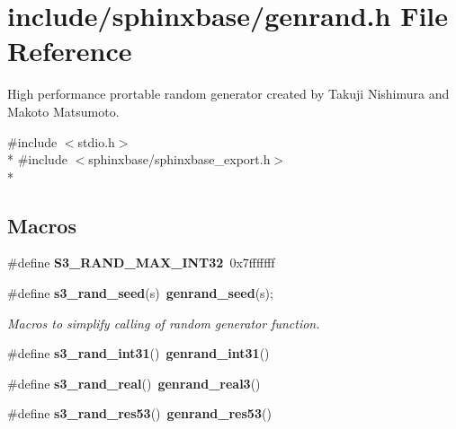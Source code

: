 \section{include/sphinxbase/genrand.h File Reference}
\label{genrand_8h}


High performance prortable random generator created by Takuji Nishimura and Makoto Matsumoto.  


{\ttfamily \#include $<$stdio.\-h$>$}\\*
{\ttfamily \#include $<$sphinxbase/sphinxbase\-\_\-export.\-h$>$}\\*
\subsection*{Macros}
\begin{DoxyCompactItemize}
\item 
\#define {\bfseries S3\-\_\-\-R\-A\-N\-D\-\_\-\-M\-A\-X\-\_\-\-I\-N\-T32}~0x7fffffff\label{genrand_8h_a29d6253e4a57e7c4d56cf7f6155b4007}

\item 
\#define {\bf s3\-\_\-rand\-\_\-seed}(s)~{\bf genrand\-\_\-seed}(s);\label{genrand_8h_a88ed88daecb88e115d8559c1b0a09bb7}

\begin{DoxyCompactList}\small\item\em Macros to simplify calling of random generator function. \end{DoxyCompactList}\item 
\#define {\bfseries s3\-\_\-rand\-\_\-int31}()~{\bf genrand\-\_\-int31}()\label{genrand_8h_a3dcc058023a95c0a0ca1f12d1fdec9b9}

\item 
\#define {\bfseries s3\-\_\-rand\-\_\-real}()~{\bf genrand\-\_\-real3}()\label{genrand_8h_a85a5844eace98dcbb4742d408a75d5e7}

\item 
\#define {\bfseries s3\-\_\-rand\-\_\-res53}()~{\bf genrand\-\_\-res53}()\label{genrand_8h_a226b9a1deec002aeb1f1775b830a3062}

\end{DoxyCompactItemize}
